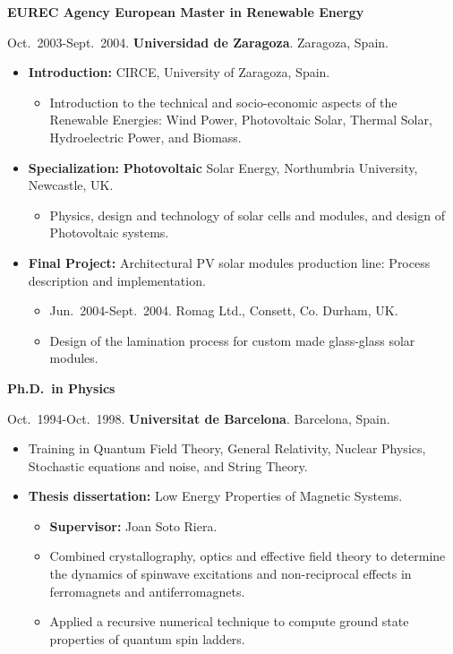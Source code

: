 \documentclass{article}
\begin{document}
\medskip
{\bf EUREC Agency European Master in Renewable Energy}

\medskip
Oct.~2003-Sept.~2004. {\bf Universidad de Zaragoza}. Zaragoza, Spain.

\begin{itemize}\itemsep 0pt
\item {\bf Introduction:} CIRCE, University of Zaragoza, Spain.
\begin{itemize}
\item Introduction to the technical and socio-economic aspects of the Renewable Energies: Wind Power, Photovoltaic Solar, Thermal Solar, Hydroelectric Power, and Biomass.
\end{itemize}
\item {\bf Specialization:} {\bf Photovoltaic} Solar Energy, Northumbria University, Newcastle, UK.
\begin{itemize}
\item Physics, design and technology of solar cells and modules, and design of Photovoltaic systems.
\end{itemize}
\item {\bf Final Project:} Architectural PV solar modules production line: Process description and implementation.
\begin{itemize}
\item Jun.~2004-Sept.~2004. Romag Ltd., Consett, Co. Durham, UK.
\item Design of the lamination process for custom made glass-glass solar modules.
\end{itemize}
\end{itemize}

\newpage
\medskip
{\bf Ph.D.\ in Physics}

\medskip
Oct.~1994-Oct.~1998. {\bf Universitat de Barcelona}. Barcelona, Spain.

\begin{itemize}\itemsep 0pt
\item Training in Quantum Field Theory, General Relativity, Nuclear Physics, 
Stochastic equations and noise, and String Theory.
\item {\bf Thesis dissertation:} Low Energy Properties of Magnetic Systems.
\begin{itemize}
\item {\bf Supervisor:} Joan Soto Riera.
\item Combined crystallography, optics and effective field theory to determine the dynamics of spinwave excitations and non-reciprocal effects in ferromagnets and antiferromagnets.
\item Applied a recursive numerical technique to compute ground state properties of quantum spin ladders.
\end{itemize}
\end{itemize}
\end{document}
